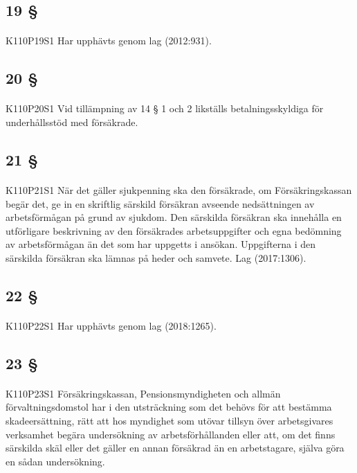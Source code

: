 \documentclass[a4paper,notitlepage,openany,10pt]{book}
\begin{document}
\subsection*{19 §}
\paragraph*{}
{\tiny K110P19S1}
Har upphävts genom
lag (2012:931).
\subsection*{20 §}
\paragraph*{}
{\tiny K110P20S1}
Vid tillämpning av 14 § 1 och 2 likställs betalningsskyldiga för underhållsstöd med försäkrade.
\subsection*{21 §}
\paragraph*{}
{\tiny K110P21S1}
När det gäller sjukpenning ska den försäkrade, om Försäkringskassan begär det, ge in en skriftlig särskild försäkran avseende nedsättningen av arbetsförmågan på grund av sjukdom. Den särskilda försäkran ska innehålla en utförligare beskrivning av den försäkrades arbetsuppgifter och egna bedömning av arbetsförmågan än det som har uppgetts i ansökan. Uppgifterna i den särskilda försäkran ska lämnas på heder och samvete.
Lag (2017:1306).
\subsection*{22 §}
\paragraph*{}
{\tiny K110P22S1}
Har upphävts genom
lag (2018:1265).
\subsection*{23 §}
\paragraph*{}
{\tiny K110P23S1}
Försäkringskassan, Pensionsmyndigheten och allmän förvaltningsdomstol har i den utsträckning som det behövs för att bestämma skadeersättning, rätt att hos myndighet som utövar tillsyn över arbetsgivares verksamhet begära undersökning av arbetsförhållanden eller att, om det finns särskilda skäl eller det gäller en annan försäkrad än en arbetstagare, själva göra en sådan undersökning.
\end{document}
